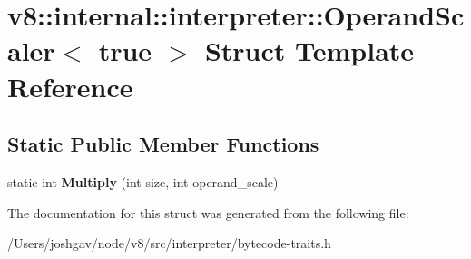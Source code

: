 \hypertarget{structv8_1_1internal_1_1interpreter_1_1_operand_scaler_3_01true_01_4}{}\section{v8\+:\+:internal\+:\+:interpreter\+:\+:Operand\+Scaler$<$ true $>$ Struct Template Reference}
\label{structv8_1_1internal_1_1interpreter_1_1_operand_scaler_3_01true_01_4}
\subsection*{Static Public Member Functions}
\begin{DoxyCompactItemize}
\item 
static int {\bfseries Multiply} (int size, int operand\+\_\+scale)\hypertarget{structv8_1_1internal_1_1interpreter_1_1_operand_scaler_3_01true_01_4_a3b8fe3ccf78ef12fcf09d63978392684}{}\label{structv8_1_1internal_1_1interpreter_1_1_operand_scaler_3_01true_01_4_a3b8fe3ccf78ef12fcf09d63978392684}

\end{DoxyCompactItemize}


The documentation for this struct was generated from the following file\+:\begin{DoxyCompactItemize}
\item 
/\+Users/joshgav/node/v8/src/interpreter/bytecode-\/traits.\+h\end{DoxyCompactItemize}
